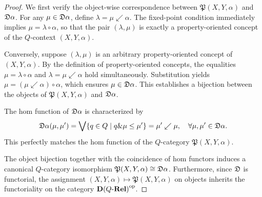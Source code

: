 \documentclass{tac}
\begin{document}
\begin{proof}
We first verify the object-wise correspondence between $\mathfrak{P}(X,Y,\alpha)$ and $\mathfrak{D}\alpha$. For any $\mu\in\mathfrak{D}\alpha$, define $\lambda=\mu\swarrow\alpha$. The fixed-point condition immediately implies $\mu=\lambda\circ\alpha$, so that the pair $(\lambda,\mu)$ is exactly a property-oriented concept of the $Q$-context $(X,Y,\alpha)$.

Conversely, suppose $(\lambda,\mu)$ is an arbitrary property-oriented concept of $(X,Y,\alpha)$. By the definition of property-oriented concepts, the equalities $\mu=\lambda\circ\alpha$ and $\lambda=\mu\swarrow\alpha$ hold simultaneously. Substitution yields $\mu=(\mu\swarrow\alpha)\circ\alpha$, which ensures $\mu\in\mathfrak{D}\alpha$. This establishes a bijection between the objects of $\mathfrak{P}(X,Y,\alpha)$ and $\mathfrak{D}\alpha$.

The hom function of $\mathfrak{D}\alpha$ is characterized by
\[
\mathfrak{D}\alpha(\mu,\mu')=\bigvee\{q\in Q\mid q\&\mu\leq\mu'\}=\mu'\swarrow\mu,\quad \forall\mu,\mu'\in\mathfrak{D}\alpha. 
\]
This perfectly matches the hom function of the $Q$-category $\mathfrak{P}(X,Y,\alpha)$.

The object bijection together with the coincidence of hom functors induces a canonical $Q$-category isomorphism $\mathfrak{P}(X,Y,\alpha)\cong\mathfrak{D}\alpha$. Furthermore, since $\mathfrak{D}$ is functorial, the assignment $(X,Y,\alpha)\mapsto\mathfrak{P}(X,Y,\alpha)$ on objects inherits the functoriality on the category ${\mathbf{D}(Q\text{-}\mathbf{Rel})}^{\mathrm{op}}$.
\end{proof}
\end{document}
